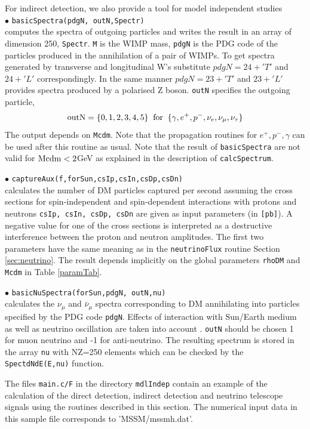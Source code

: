 \documentclass[12pt,a4paper]{article}
\begin{document}
For indirect detection, we also provide a tool for model independent studies\\ 
\noindent
$\bullet$ \verb|basicSpectra(pdgN, outN,Spectr)|\\
computes the spectra of outgoing particles and writes the result in an array of dimension 250, \verb|Spectr|.
\verb|M| is the WIMP mass, \verb|pdgN| is the PDG code of the particles produced in the annihilation of a pair of 
WIMPs. To get spectra generated by transverse and longitudinal W's substitute 
$ pdgN=24+'T'$ and $24+'L'$ correspondingly. In the same manner $pdgN=23+'T'$ and
$23+'L'$  provides spectra produced by a polarised Z boson.
 \verb|outN|  specifies the outgoing particle,
$$ {\rm outN} = \{0,1,2,3,4,5\} \;\; {\rm for}\;\; \{\gamma,   e^+,  p^-, \nu_e,
\nu_{\mu},\nu_{\tau}\} $$
The output depends on {\tt Mcdm}.
Note that the  propagation routines for $e^+,p^-,\gamma$ can be used after 
this routine as usual. Note that the result of {\tt basicSpectra}
are not valid for ${\rm Mcdm} < 2$GeV as explained in the description of {\tt calcSpectrum}.

\noindent $\bullet$ \verb|captureAux(f,forSun,csIp,csIn,csDp,csDn)|\\
calculates the number of DM particles captured per second assuming the cross sections
for  spin-independent and spin-dependent 
interactions with protons and neutrons   {\tt csIp, csIn, csDp, csDn} are
given as input parameters (in {\tt [pb]}). 
A negative value for one of the cross sections  is interpreted as a destructive
interference between the  proton and neutron amplitudes. The first two
parameters have the same meaning as in the {\tt neutrinoFlux} routine Section \ref{sec:neutrino}. The
result  depends implicitly on the global parameters {\tt rhoDM} and {\tt
Mcdm} in Table \ref{paramTab}. 


\noindent
$\bullet$ \verb|basicNuSpectra(forSun,pdgN, outN,nu)|\\
calculates the $\nu_{\mu}$ and $\bar{\nu}_{\mu}$  spectra corresponding to  DM annihilating into particles specified by the PDG code {\tt pdgN}. Effects of interaction with Sun/Earth medium as well as neutrino oscillation  are taken into account \cite{Cirelli:2005gh}.
{\tt outN} should be chosen 1 for muon neutrino and -1 for anti-neutrino. The resulting spectrum is stored in the array 
  \verb|nu| with NZ=250 elements  which can be checked by the {\tt SpectdNdE(E,nu)}
function.


The files {\verb|main.c/F|} in the directory {\tt mdlIndep}  contain an example of the calculation of the direct detection,  indirect detection
and neutrino telescope signals using the routines described in this section. 
The numerical input data in this sample file corresponds to 'MSSM/mssmh.dat'. 
\end{document}
